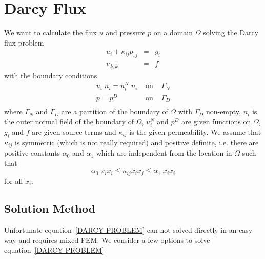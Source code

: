 
%
%
%

\section{Darcy Flux}
\label{DARCY FLUX}
We want to calculate the flux $u$ and pressure $p$ on a domain $\Omega$
solving the Darcy flux problem
\begin{equation}\label{DARCY PROBLEM}
\begin{array}{rcl}
u_{i} + \kappa_{ij} p_{,j} & = & g_{i} \\
u_{k,k} & = & f
\end{array}
\end{equation} 
with the boundary conditions
\begin{equation}\label{DARCY BOUNDARY}
\begin{array}{rcl}
u_{i} \; n_{i}  = u^{N}_{i}  \; n_{i} & \mbox{ on } & \Gamma_{N} \\
p = p^{D} &  \mbox{ on } & \Gamma_{D} \\ 
\end{array}
\end{equation} 
where $\Gamma_{N}$ and $\Gamma_{D}$ are a partition of the boundary of
$\Omega$ with $\Gamma_{D}$ non-empty, $n_{i}$ is the outer normal field of the
boundary of $\Omega$, $u^{N}_{i}$ and $p^{D}$ are given functions on $\Omega$,
$g_{i}$ and $f$ are given source terms and $\kappa_{ij}$ is the given
permeability.
We assume that $\kappa_{ij}$ is symmetric (which is not really required) and
positive definite, i.e. there are positive constants $\alpha_{0}$ and
$\alpha_{1}$ which are independent from the location in $\Omega$ such that
\begin{equation}
\alpha_{0} \; x_{i} x_{i} \le \kappa_{ij} x_{i} x_{j} \le \alpha_{1} \; x_{i} x_{i}
\end{equation}
for all $x_{i}$.


\subsection{Solution Method \label{DARCY SOLVE}}
Unfortunate equation~\ref{DARCY PROBLEM} can not solved directly in an easy way and requires mixed FEM.  
We consider a few options to solve equation~\ref{DARCY PROBLEM}
